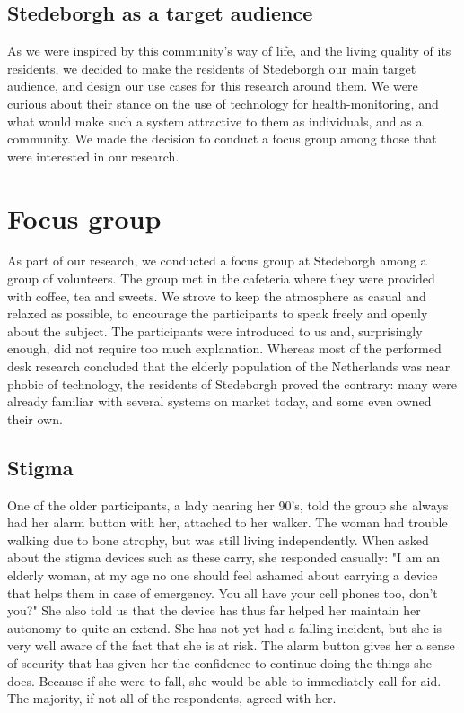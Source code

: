 \documentclass{below-ext}
\begin{document}
\subsection{Stedeborgh as a target audience}
As we were inspired by this community's way of life, and the living quality of its residents, we decided to make the residents of Stedeborgh our main target audience, and design our use cases for this research around them. We were curious about their stance on the use of technology for health-monitoring, and what would make such a system attractive to them as individuals, and as a community. We made the decision to conduct a focus group among those that were interested in our research.

\section{Focus group}

As part of our research, we conducted a focus group at Stedeborgh among a group of volunteers. The group met in the cafeteria where they were provided with coffee, tea and sweets. We strove to keep the atmosphere as casual and relaxed as possible, to encourage the participants to speak freely and openly about the subject. The participants were introduced to us and, surprisingly enough, did not require too much explanation. Whereas most of the performed desk research concluded that the elderly population of the Netherlands was near phobic of technology, the residents of Stedeborgh proved the contrary: many were already familiar with several systems on market today, and some even owned their own.

\subsection{Stigma}
\label{ref:alarm_button}
 One of the older participants, a lady nearing her 90's, told the group she always had her alarm button with her, attached to her walker. The woman had trouble walking due to bone atrophy, but was still living independently. When asked about the stigma devices such as these carry, she responded casually: "I am an elderly woman, at my age no one should feel ashamed about carrying a device that helps them in case of emergency. You all have your cell phones too, don't you?" She also told us that the device has thus far helped her maintain her autonomy to quite an extend. She has not yet had a falling incident, but she is very well aware of the fact that she is at risk. The alarm button gives her a sense of security that has given her the confidence to continue doing the things she does. Because if she were to fall, she would be able to immediately call for aid. The majority, if not all of the respondents, agreed with her.
\end{document}
